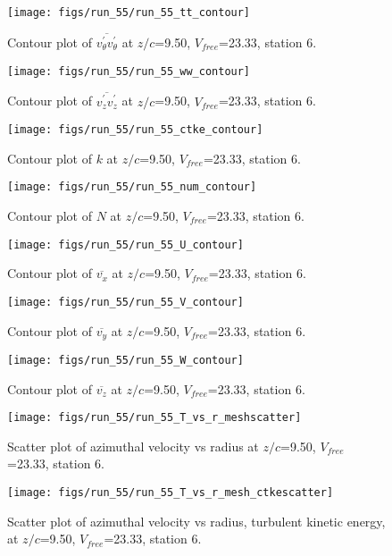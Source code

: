 \begin{figure}[H]
\centering
\texttt{[image: figs/run\_55/run\_55\_tt\_contour]}
\caption{Contour plot of $\overline{v_{\theta}^{\prime} v_{\theta}^{\prime}}$ at $z/c$=9.50, $V_{free}$=23.33, station 6.}
\end{figure}


\begin{figure}[H]
\centering
\texttt{[image: figs/run\_55/run\_55\_ww\_contour]}
\caption{Contour plot of $\overline{v_{z}^{\prime} v_{z}^{\prime}}$ at $z/c$=9.50, $V_{free}$=23.33, station 6.}
\end{figure}


\begin{figure}[H]
\centering
\texttt{[image: figs/run\_55/run\_55\_ctke\_contour]}
\caption{Contour plot of $k$ at $z/c$=9.50, $V_{free}$=23.33, station 6.}
\end{figure}


\begin{figure}[H]
\centering
\texttt{[image: figs/run\_55/run\_55\_num\_contour]}
\caption{Contour plot of $N$ at $z/c$=9.50, $V_{free}$=23.33, station 6.}
\end{figure}


\begin{figure}[H]
\centering
\texttt{[image: figs/run\_55/run\_55\_U\_contour]}
\caption{Contour plot of $\overline{v_{x}}$ at $z/c$=9.50, $V_{free}$=23.33, station 6.}
\end{figure}


\begin{figure}[H]
\centering
\texttt{[image: figs/run\_55/run\_55\_V\_contour]}
\caption{Contour plot of $\overline{v_{y}}$ at $z/c$=9.50, $V_{free}$=23.33, station 6.}
\end{figure}


\begin{figure}[H]
\centering
\texttt{[image: figs/run\_55/run\_55\_W\_contour]}
\caption{Contour plot of $\overline{v_{z}}$ at $z/c$=9.50, $V_{free}$=23.33, station 6.}
\end{figure}


\begin{figure}[H]
\centering
\texttt{[image: figs/run\_55/run\_55\_T\_vs\_r\_meshscatter]}
\caption{Scatter plot of azimuthal velocity vs radius at $z/c$=9.50, $V_{free}$=23.33, station 6.}
\end{figure}


\begin{figure}[H]
\centering
\texttt{[image: figs/run\_55/run\_55\_T\_vs\_r\_mesh\_ctkescatter]}
\caption{Scatter plot of azimuthal velocity vs radius, turbulent kinetic energy, at $z/c$=9.50, $V_{free}$=23.33, station 6.}
\end{figure}



